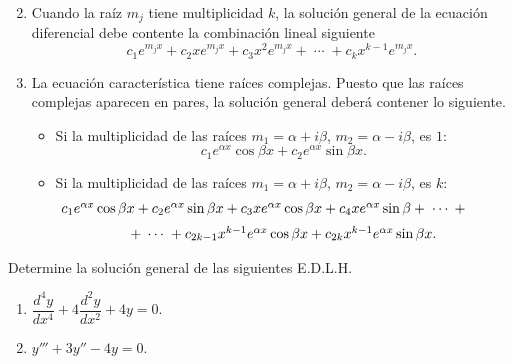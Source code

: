 \documentclass{beamer}
\begin{document}
\begin{frame}[t]
	\begin{block}{}
		\begin{enumerate}
			\setcounter{enumi}{1}
		\item Cuando la raíz \(m_j\) tiene multiplicidad \(k\), la solución general de la ecuación diferencial debe contente la combinación lineal siguiente
			\[
				c_1e^{m_jx} + c_2xe^{m_jx} +c_3x^2e^{m_jx} + \;\cdots\; + c_{k} x^{k-1} e^{m_jx}.
			\]
		\item La ecuación característica tiene raíces complejas. Puesto que las raíces complejas aparecen en pares, la solución general deberá contener lo siguiente.
			\begin{itemize}
				\item Si la multiplicidad de las raíces \(m_1= \alpha +i \beta\), \(m_2= \alpha -i \beta\), es \(1\):
					\[
						c_1e^{\alpha x} \cos \beta x+ c_2 e^{\alpha x} \sin \beta x.
					\]
				\item Si la multiplicidad de las raíces \(m_1= \alpha +i \beta\), \(m_2 = \alpha - i \beta\), es \(k\):
					\[
						\begin{array}{c}
							\hspace{-1cm} c_1e^{\alpha x} \cos \beta x + c_2e^{\alpha x} \sin \beta x + c_3xe^{\alpha x} \cos \beta x + c_4xe^{\alpha x} \sin \beta + \;\cdots\; + \\[2mm]
							+ \;\cdots\; + c_{2k-1} x^{k-1} e^{\alpha x} \cos \beta x+c_{2k} x^{k-1} e^{\alpha x} \sin \beta x.
						\end{array}
					\]
			\end{itemize}
		\end{enumerate}
	\end{block}
\end{frame}

\begin{frame}[t]
	\begin{example}
		Determine la solución general de las siguientes E.D.L.H.
		\begin{enumerate}
			\item \(\dfrac{d^4y}{dx^4} +4 \dfrac{d^2y}{dx^2} +4y=0\).
			\item \(y''' + 3y'' -4y=0\).
		\end{enumerate}
	\end{example}
\end{frame}
\end{document}
